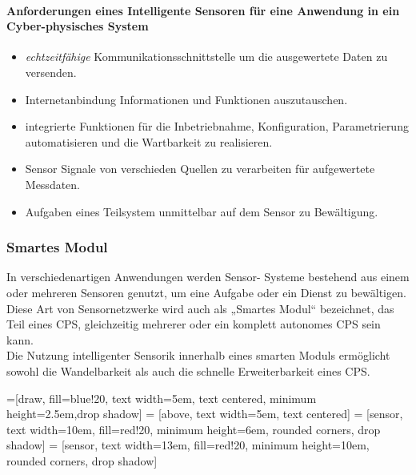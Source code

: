 \documentclass[a4paper,12pt]{scrartcl}
\begin{document}
\paragraph{Anforderungen eines Intelligente Sensoren für eine Anwendung in ein Cyber-physisches System \cite[Seite 14 ff.]{Furstenberg.2016}
}
\singlespacing
\begin{itemize}
\item \textit{echtzeitfähige} Kommunikationsschnittstelle um die ausgewertete Daten zu versenden.
\item Internetanbindung Informationen und Funktionen auszutauschen.
\item integrierte Funktionen für die Inbetriebnahme, Konfiguration, Parametrierung
automatisieren und die Wartbarkeit zu realisieren.
\item Sensor Signale von verschieden Quellen zu verarbeiten für
aufgewertete Messdaten.
\item Aufgaben eines Teilsystem unmittelbar auf dem Sensor zu Bewältigung.
\end{itemize}

\onehalfspacing
\subsubsection{Smartes Modul}
In verschiedenartigen Anwendungen werden Sensor-
Systeme bestehend aus einem oder mehreren Sensoren genutzt, um eine Aufgabe oder ein Dienst zu bewältigen. Diese Art von Sensornetzwerke wird auch als
„Smartes Modul“ bezeichnet, das Teil eines CPS, gleichzeitig mehrerer oder ein komplett autonomes CPS
sein kann.\\
Die Nutzung intelligenter Sensorik innerhalb eines smarten
Moduls ermöglicht sowohl die Wandelbarkeit als auch die schnelle Erweiterbarkeit eines CPS.\cite[Seite 15 ff.]{Furstenberg.2016}


\vspace{0.5cm}


=[draw, fill=blue!20, text width=5em, 
    text centered, minimum height=2.5em,drop shadow]
 = [above, text width=5em, text centered]
 = [sensor, text width=10em, fill=red!20, 
    minimum height=6em, rounded corners, drop shadow]
 = [sensor, text width=13em, fill=red!20, 
    minimum height=10em, rounded corners, drop shadow]
\end{document}
